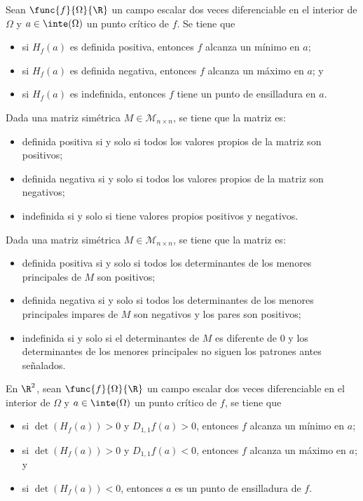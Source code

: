 \documentclass[a4,11pt]{aleph-notas}
\begin{document}
\begin{teo}
    Sean $\func{f}{\Omega}{\R}$ un campo escalar dos veces diferenciable en el interior de $\Omega$ y $a\in\inte(\Omega)$ un punto crítico de $f$. Se tiene que
    \begin{itemize}
        \item si $H_f(a)$ es definida positiva, entonces $f$ alcanza un mínimo en $a$;
        \item si $H_f(a)$ es definida negativa, entonces $f$ alcanza un máximo en $a$; y
        \item si $H_f(a)$ es indefinida, entonces $f$ tiene un punto de ensilladura en $a$.
    \end{itemize}
\end{teo}
 

\begin{prop}
    Dada una matriz simétrica $M\in \mathcal{M}_{n\times n}$, se tiene que la matriz es:
    \begin{itemize}
        \item definida positiva si y solo si todos los valores propios de la matriz son positivos;
        \item definida negativa si y solo si todos los valores propios de la matriz son negativos;
        \item indefinida si y solo si tiene valores propios positivos y negativos.
    \end{itemize}
\end{prop}
 

\begin{prop}
    Dada una matriz simétrica $M\in \mathcal{M}_{n\times n}$, se tiene que la matriz es:
    \begin{itemize}
        \item definida positiva si y solo si todos los determinantes de los menores principales de $M$ son positivos;
        \item definida negativa si y solo si todos los determinantes de los menores principales impares de $M$ son negativos y los pares son positivos;
        \item indefinida si y solo si el determinantes de $M$ es diferente de 0 y los determinantes de los menores principales no siguen los patrones antes señalados.
    \end{itemize}
\end{prop}
 

\begin{teo}
    En $\R^2$, sean $\func{f}{\Omega}{\R}$ un campo escalar dos veces diferenciable en el interior de $\Omega$ y $a\in\inte(\Omega)$ un punto crítico de $f$, se tiene que
    \begin{itemize}
        \item si $\det(H_f(a))>0$ y $D_{1,1}f(a) >0$, entonces $f$ alcanza un mínimo en $a$;
        \item si $\det(H_f(a))>0$ y $D_{1,1}f(a) <0$, entonces $f$ alcanza un máximo en $a$; y
        \item si $\det(H_f(a))<0$, entonces $a$ es un punto de ensilladura de $f$.
    \end{itemize}
\end{teo}
 
\end{document}
